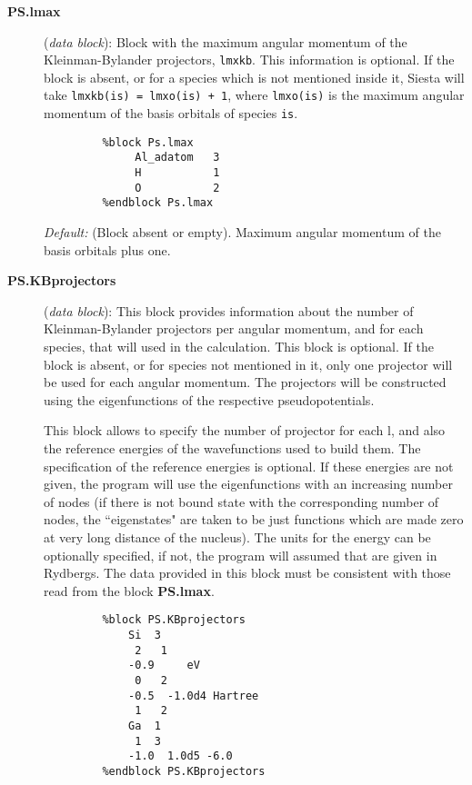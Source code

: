 \documentclass[11pt]{article}
\begin{document}
\begin{description}

\item[{\bf PS.lmax}]  ({\it data block}): 
Block with the maximum angular momentum of the Kleinman-Bylander 
projectors, {\tt lmxkb}. 
This information is optional. If the block 
is absent, or for a species which is not mentioned inside 
it, {\sc Siesta} will take {\tt lmxkb(is) = lmxo(is) + 1}, where {\tt lmxo(is)}
is the maximum angular momentum of the basis orbitals of species {\tt is}.
\begin{verbatim}
         %block Ps.lmax
              Al_adatom   3
              H           1
              O           2
         %endblock Ps.lmax
\end{verbatim}
{\it Default:} (Block absent or empty). Maximum angular momentum 
of the basis orbitals plus one.
\noindent

\item[{\bf PS.KBprojectors}] ({\it data block}):
This block provides information about the number of Kleinman-Bylander
projectors per angular momentum, and for each species, that will used
in the calculation. This block is optional.
If the block is absent, or for species not mentioned in it, only 
one projector will be used for each angular momentum. The projectors
will be constructed using the eigenfunctions of the respective
pseudopotentials. 


This block allows to specify the number of projector for each l, and also
the reference energies of the wavefunctions used to build them.
The specification of the reference energies is optional. If these 
energies are not given, the program will use the eigenfunctions with an
increasing number of nodes (if there is not bound state with
the corresponding number of nodes, the ``eigenstates" are taken to be just
functions which are made zero at very long distance of the nucleus).
The units for the energy can be optionally specified, if not, the 
program will assumed that are given in Rydbergs. 
The data provided in this block must be consistent with those 
read from the block {\bf PS.lmax}. 

\begin{verbatim}
         %block PS.KBprojectors
             Si  3
              2   1 
             -0.9     eV
              0   2
             -0.5  -1.0d4 Hartree
              1   2
             Ga  1
              1  3
             -1.0  1.0d5 -6.0
         %endblock PS.KBprojectors
\end{verbatim}


\end{description}
\end{document}
